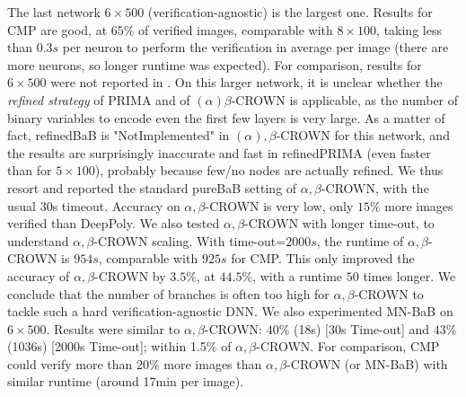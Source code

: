 The last network $6 \times 500$ (verification-agnostic) is the largest one. 
Results for CMP are good, at $65\%$ of verified images, comparable with $8\times 100$, taking less than $0.3s$ per neuron to perform the verification in average per image (there are more neurons, so longer runtime was expected). For comparison, results for $6 \times 500$ were not reported in \cite{CROWN,prima}. On this larger network, it is unclear whether the {\em refined strategy} of PRIMA and of $(\alpha)\beta$-CROWN is applicable, as the number of binary variables to encode even the first few layers is very large. As a matter of fact, refinedBaB is "NotImplemented" in $(\alpha),\beta$-CROWN for this network, and the results are surprisingly inaccurate and fast in refinedPRIMA (even faster than for $5 \times 100$), probably because few/no nodes are actually refined. We thus resort and reported the standard pureBaB setting of $\alpha,\beta$-CROWN, with the usual 30s timeout. Accuracy on $\alpha,\beta$-CROWN is very low, only $15\%$ more images verified than DeepPoly. 
We also tested $\alpha,\beta$-CROWN with longer time-out, to understand $\alpha,\beta$-CROWN scaling. With time-out=$2000s$, the runtime of $\alpha,\beta$-CROWN is $954s$, comparable with $925s$ for CMP. This only improved the accuracy of $\alpha,\beta$-CROWN by $3.5\%$, at $44.5\%$, with a runtime $50$ times longer. We conclude that the number of branches is often too high for $\alpha,\beta$-CROWN to tackle such a hard verification-agnostic DNN. We also experimented MN-BaB \cite{ferrari2022complete} on $6 \times 500$. Results were similar to $\alpha,\beta$-CROWN: $40\%$ (18s) [30s Time-out] and $43\%$ (1036s) [2000s Time-out]; within 1.5\% of $\alpha,\beta$-CROWN. For comparison, CMP could verify more than $20\%$ more images than $\alpha,\beta$-CROWN (or MN-BaB) with similar runtime (around 17min per image).




